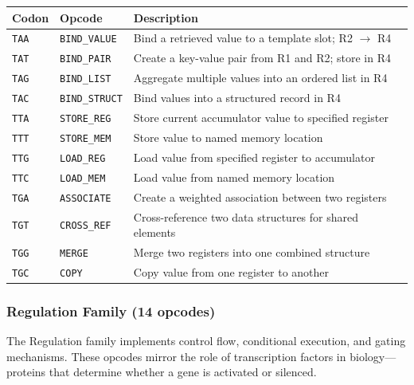 \begin{center}
\renewcommand{\arraystretch}{1.1}
\small
\begin{tabularx}{0.97\textwidth}{L{1.2cm} L{3cm} Y}
\toprule
\textbf{Codon} & \textbf{Opcode} & \textbf{Description} \\
\midrule
\texttt{TAA} & \texttt{BIND\_VALUE} & Bind a retrieved value to a template slot; R2 $\to$ R4 \\
\texttt{TAT} & \texttt{BIND\_PAIR} & Create a key-value pair from R1 and R2; store in R4 \\
\texttt{TAG} & \texttt{BIND\_LIST} & Aggregate multiple values into an ordered list in R4 \\
\texttt{TAC} & \texttt{BIND\_STRUCT} & Bind values into a structured record in R4 \\
\texttt{TTA} & \texttt{STORE\_REG} & Store current accumulator value to specified register \\
\texttt{TTT} & \texttt{STORE\_MEM} & Store value to named memory location \\
\texttt{TTG} & \texttt{LOAD\_REG} & Load value from specified register to accumulator \\
\texttt{TTC} & \texttt{LOAD\_MEM} & Load value from named memory location \\
\texttt{TGA} & \texttt{ASSOCIATE} & Create a weighted association between two registers \\
\texttt{TGT} & \texttt{CROSS\_REF} & Cross-reference two data structures for shared elements \\
\texttt{TGG} & \texttt{MERGE} & Merge two registers into one combined structure \\
\texttt{TGC} & \texttt{COPY} & Copy value from one register to another \\
\bottomrule
\end{tabularx}
\end{center}

\subsubsection{Regulation Family (14 opcodes)}

The Regulation family implements control flow, conditional execution, and gating mechanisms. These opcodes mirror the role of transcription factors in biology---proteins that determine whether a gene is activated or silenced.

